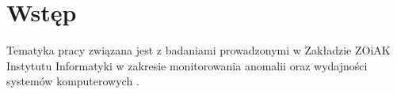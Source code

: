 \chapter{Wstęp}

Tematyka pracy związana jest z badaniami prowadzonymi w Zakładzie ZOiAK Instytutu Informatyki w zakresie monitorowania anomalii oraz wydajności systemów komputerowych \cite{introd_1,introd_2,introd_3,introd_4}.

